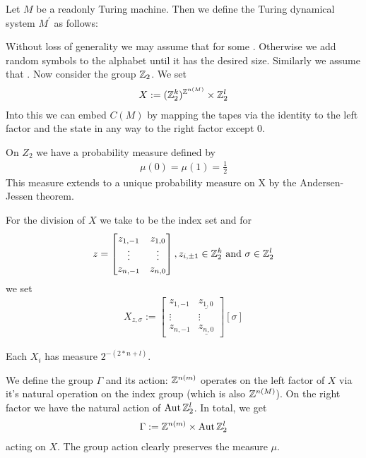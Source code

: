 Let $M$ be a readonly Turing machine.
Then we define the Turing dynamical system $M^\prime$ as follows:

Without loss of generality we may assume that  for some .
Otherwise we add random symbols to the alphabet until it has the desired size.
Similarly we assume that .
Now consider the group $\mathbb{Z}_2$.
We set
\begin{align*}
	X := {(\mathbb{Z}_2^{k})^{\mathbb{Z}^{n(M)}}} \times \mathbb{Z}_2^l
\end{align*}
Into this we can embed $C(M)$ by mapping the tapes via the identity to the left factor and the state in any way to the right factor except $0$.

On $Z_2$ we have a probability measure defined by
\begin{align*}
	\mu(0) = \mu(1) = \frac12
\end{align*}
This measure extends to a unique probability measure on X by the Andersen-Jessen theorem. %


For the division of $X$ we take  to be the index set and for
\begin{align*}
	z =
	\begin{bmatrix}
		z_{1,-1} & z_{1,0} \\
		\vdots & \vdots \\
		z_{n,-1} & z_{n,0}
	\end{bmatrix}, z_{i,\pm 1} \in \mathbb{Z}_2^k ~\text{and}~ \sigma \in \mathbb{Z}_2^l
\end{align*}
we set
\begin{align*}
	X_{z,\sigma} :=
	\begin{bmatrix}
		z_{1,-1} & \underline{z_{1,0}} \\
		\vdots & \vdots \\
		z_{n,-1} & \underline{z_{n,0}}
	\end{bmatrix} [ \sigma ]
\end{align*}

\remark Each $X_i$ has measure $2^{-(2*n+l)}$.

We define the group $\Gamma$ and its action:
$\mathbb{Z}^{n(m)}$ operates on the left factor of $X$ via it's natural operation on the index group (which is also $\mathbb{Z}^{n(M)}$).
On the right factor we have the natural action of $\operatorname{Aut} \mathbb{Z}_2^l$.
In total, we get
\begin{align*}
	\Gamma := \mathbb{Z}^{n(m)} \times \operatorname{Aut} \mathbb{Z}_2^l
\end{align*}
acting on $X$.
The group action clearly preserves the measure $\mu$.


